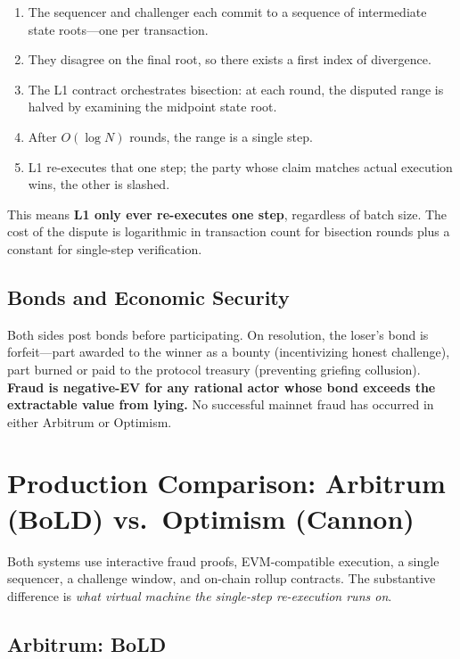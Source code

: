\documentclass[11pt,letterpaper]{article}
\begin{document}
\begin{enumerate}[leftmargin=*, itemsep=2pt]
    \item The sequencer and challenger each commit to a sequence of intermediate state roots---one per transaction.
    \item They disagree on the final root, so there exists a first index of divergence.
    \item The L1 contract orchestrates bisection: at each round, the disputed range is halved by examining the midpoint state root.
    \item After $O(\log N)$ rounds, the range is a single step.
    \item L1 re-executes that one step; the party whose claim matches actual execution wins, the other is slashed.
\end{enumerate}

This means \textbf{L1 only ever re-executes one step}, regardless of batch size. The cost of the dispute is logarithmic in transaction count for bisection rounds plus a constant for single-step verification.

\subsection{Bonds and Economic Security}

Both sides post bonds before participating. On resolution, the loser's bond is forfeit---part awarded to the winner as a bounty (incentivizing honest challenge), part burned or paid to the protocol treasury (preventing griefing collusion). \textbf{Fraud is negative-EV for any rational actor whose bond exceeds the extractable value from lying.} No successful mainnet fraud has occurred in either Arbitrum or Optimism.

\section{Production Comparison: Arbitrum (BoLD) vs.\ Optimism (Cannon)}

Both systems use interactive fraud proofs, EVM-compatible execution, a single sequencer, a challenge window, and on-chain rollup contracts. The substantive difference is \emph{what virtual machine the single-step re-execution runs on}.

\subsection{Arbitrum: BoLD}
\end{document}
